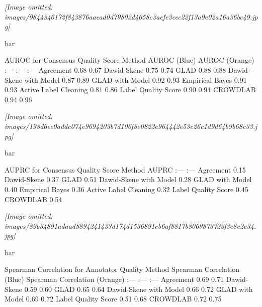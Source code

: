 \documentclass[
]{article}
\begin{document}
\textit{[Image omitted: images/9844346172f843876aaead0d79802d4658c3aefe3cec22f13a9e02a16a36bc49.jpg]}

bar

AUROC for Consensus Quality Score \textbar{} Method \textbar{} AUROC
(Blue) \textbar{} AUROC (Orange) \textbar{} \textbar{} :--- \textbar{}
:--- \textbar{} :--- \textbar{} \textbar{} Agreement \textbar{} 0.68
\textbar{} 0.67 \textbar{} \textbar{} Dawid-Skene \textbar{} 0.75
\textbar{} 0.74 \textbar{} \textbar{} GLAD \textbar{} 0.88 \textbar{}
0.88 \textbar{} \textbar{} Dawid-Skene with Model \textbar{} 0.87
\textbar{} 0.89 \textbar{} \textbar{} GLAD with Model \textbar{} 0.92
\textbar{} 0.93 \textbar{} \textbar{} Empirical Bayes \textbar{} 0.91
\textbar{} 0.93 \textbar{} \textbar{} Active Label Cleaning \textbar{}
0.81 \textbar{} 0.86 \textbar{} \textbar{} Label Quality Score
\textbar{} 0.90 \textbar{} 0.94 \textbar{} \textbar{} CROWDLAB
\textbar{} 0.94 \textbar{} 0.96 \textbar{}

\textit{[Image omitted: images/198d6ee0addc074e9694203b7d106f8e0822e964442e53c26c1d9d64b9b68c33.jpg]}

bar

AUPRC for Consensus Quality Score \textbar{} Method \textbar{} AUPRC
\textbar{} \textbar{} :--- \textbar{} :--- \textbar{} \textbar{}
Agreement \textbar{} 0.15 \textbar{} \textbar{} Dawid-Skene \textbar{}
0.37 \textbar{} \textbar{} GLAD \textbar{} 0.51 \textbar{} \textbar{}
Dawid-Skene with Model \textbar{} 0.28 \textbar{} \textbar{} GLAD with
Model \textbar{} 0.40 \textbar{} \textbar{} Empirical Bayes \textbar{}
0.36 \textbar{} \textbar{} Active Label Cleaning \textbar{} 0.32
\textbar{} \textbar{} Label Quality Score \textbar{} 0.45 \textbar{}
\textbar{} CROWDLAB \textbar{} 0.54 \textbar{}

\textit{[Image omitted: images/89b34891adaad8894241433d174d1536891eb6af8817b8069873723f3e8c2c34.jpg]}

bar

Spearman Correlation for Annotator Quality \textbar{} Method \textbar{}
Spearman Correlation (Blue) \textbar{} Spearman Correlation (Orange)
\textbar{} \textbar{} :--- \textbar{} :--- \textbar{} :--- \textbar{}
\textbar{} Agreement \textbar{} 0.69 \textbar{} 0.71 \textbar{}
\textbar{} Dawid-Skene \textbar{} 0.59 \textbar{} 0.60 \textbar{}
\textbar{} GLAD \textbar{} 0.65 \textbar{} 0.64 \textbar{} \textbar{}
Dawid-Skene with Model \textbar{} 0.66 \textbar{} 0.72 \textbar{}
\textbar{} GLAD with Model \textbar{} 0.69 \textbar{} 0.72 \textbar{}
\textbar{} Label Quality Score \textbar{} 0.51 \textbar{} 0.68
\textbar{} \textbar{} CROWDLAB \textbar{} 0.72 \textbar{} 0.75
\textbar{}
\end{document}
